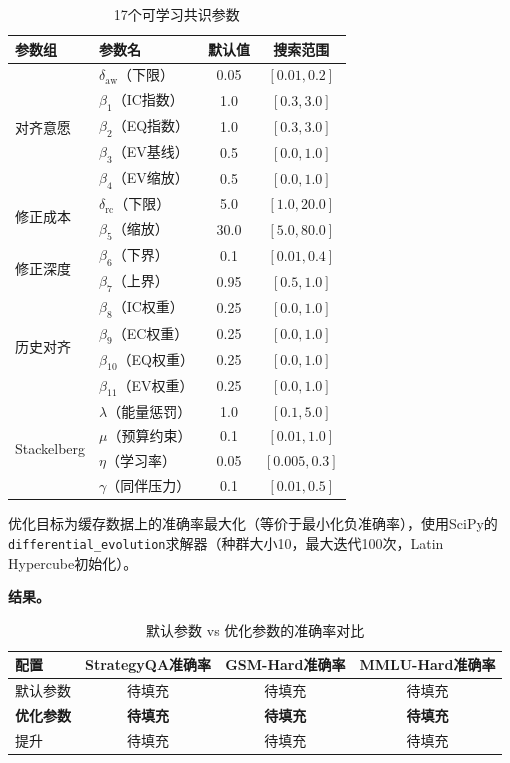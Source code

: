 \documentclass[12pt,a4paper,UTF8,fontset=fandol]{ctexart}
\begin{document}
\begin{table}[H]
\centering
\caption{17个可学习共识参数}\label{tab:params}
\begin{tabular}{llcc}
\toprule
参数组 & 参数名 & 默认值 & 搜索范围 \\
\midrule
\multirow{5}{*}{对齐意愿} & $\delta_{\text{aw}}$（下限） & 0.05 & $[0.01, 0.2]$ \\
& $\beta_1$（IC指数） & 1.0 & $[0.3, 3.0]$ \\
& $\beta_2$（EQ指数） & 1.0 & $[0.3, 3.0]$ \\
& $\beta_3$（EV基线） & 0.5 & $[0.0, 1.0]$ \\
& $\beta_4$（EV缩放） & 0.5 & $[0.0, 1.0]$ \\
\midrule
\multirow{2}{*}{修正成本} & $\delta_{\text{rc}}$（下限） & 5.0 & $[1.0, 20.0]$ \\
& $\beta_5$（缩放） & 30.0 & $[5.0, 80.0]$ \\
\midrule
\multirow{2}{*}{修正深度} & $\beta_6$（下界） & 0.1 & $[0.01, 0.4]$ \\
& $\beta_7$（上界） & 0.95 & $[0.5, 1.0]$ \\
\midrule
\multirow{4}{*}{历史对齐} & $\beta_8$（IC权重） & 0.25 & $[0.0, 1.0]$ \\
& $\beta_9$（EC权重） & 0.25 & $[0.0, 1.0]$ \\
& $\beta_{10}$（EQ权重） & 0.25 & $[0.0, 1.0]$ \\
& $\beta_{11}$（EV权重） & 0.25 & $[0.0, 1.0]$ \\
\midrule
\multirow{4}{*}{Stackelberg} & $\lambda$（能量惩罚） & 1.0 & $[0.1, 5.0]$ \\
& $\mu$（预算约束） & 0.1 & $[0.01, 1.0]$ \\
& $\eta$（学习率） & 0.05 & $[0.005, 0.3]$ \\
& $\gamma$（同伴压力） & 0.1 & $[0.01, 0.5]$ \\
\bottomrule
\end{tabular}
\end{table}

优化目标为缓存数据上的准确率最大化（等价于最小化负准确率），使用SciPy的\texttt{differential\_evolution}求解器（种群大小10，最大迭代100次，Latin Hypercube初始化）。

\textbf{结果。}

\begin{table}[H]
\centering
\caption{默认参数 vs 优化参数的准确率对比}\label{tab:exp2_result}
\begin{tabular}{lccc}
\toprule
配置 & StrategyQA准确率 & GSM-Hard准确率 & MMLU-Hard准确率 \\
\midrule
默认参数 & 待填充 & 待填充 & 待填充 \\
\textbf{优化参数} & \textbf{待填充} & \textbf{待填充} & \textbf{待填充} \\
提升 & 待填充 & 待填充 & 待填充 \\
\bottomrule
\end{tabular}
\end{table}
\end{document}
